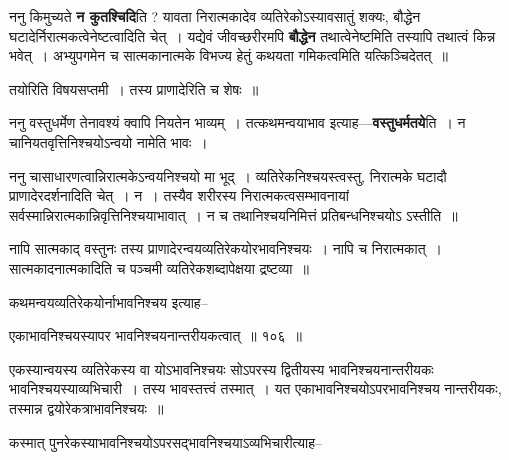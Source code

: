 \documentclass[article,12pt,a4paper]{memoir}
\begin{document}
	  \pstart ननु किमुच्यते \textbf{न कुतश्चिदि}ति ? यावता निरात्मकादेव व्यतिरेकोऽस्यावसातुं शक्यः, बौद्धेन घटादेर्निरात्मकत्वेनेष्टत्वादिति चेत् । यद्येवं जीवच्छरीरमपि \textbf{बौद्धेन} तथात्वेनेष्टमिति तस्यापि तथात्वं किन्न भवेत् । अभ्युपगमेन च सात्मकानात्मके विभज्य हेतुं कथयता गमिकत्वमिति यत्किञ्चिदेतत् ॥
	\pend
      

	  \pstart तयोरिति विषयसप्तमी । तस्य प्राणादेरिति च शेषः ॥
	\pend
      

	  \pstart ननु वस्तुधर्मेण तेनावश्यं क्वापि नियतेन भाव्यम् । तत्कथमन्वयाभाव इत्याह—\textbf{वस्तुधर्मतये}ति । न चानियतवृत्तिनिश्चयोऽन्वयो नामेति भावः ।
	\pend
      

	  \pstart ननु चासाधारणत्वान्निरात्मकेऽन्वयनिश्चयो मा भूद् । व्यतिरेकनिश्चयस्त्वस्तु, निरात्मके घटादौ प्राणादेरदर्शनादिति चेत् । न । तस्यैव \leavevmode{} शरीरस्य निरात्मकत्वसम्भावनायां सर्वस्मान्निरात्मकान्निवृत्तिनिश्चयाभावात् । न च तथानिश्चयनिमित्तं प्रतिबन्धनिश्चयोऽ ऽस्तीति ॥
	\pend
	  \bigskip
	  \begingroup
	

	  \pstart नापि सात्मकाद् वस्तुनः तस्य प्राणादेरन्वयव्यतिरेकयोरभावनिश्चयः । नापि च निरात्मकात् । सात्मकादनात्मकादिति च पञ्चमी व्यतिरेकशब्दापेक्षया द्रष्टव्या ॥
	\pend
        

	  \pstart कथमन्वयव्यतिरेकयोर्नाभावनिश्चय इत्याह--
	\pend
        
	  \bigskip
	  \begingroup
	

	  \pstart {}एकाभावनिश्चयस्यापर भावनिश्चयनान्तरीयकत्वात् ॥ १०६ ॥
	\pend
      
	  \endgroup
	 

	  \pstart एकस्यान्वयस्य व्यतिरेकस्य वा योऽभावनिश्चयः सोऽपरस्य द्वितीयस्य भावनिश्चयनान्तरीयकः भावनिश्चयस्याव्यभिचारी । तस्य भावस्तत्त्वं तस्मात् । यत एकाभावनिश्चयोऽपरभावनिश्चय नान्तरीयकः, तस्मान्न द्वयोरेकत्राभावनिश्चयः ॥
	\pend
        

	  \pstart कस्मात् पुनरेकस्याभावनिश्चयोऽपरसद्भावनिश्चयाऽव्यभिचारीत्याह--
	\pend
        
\end{document}
